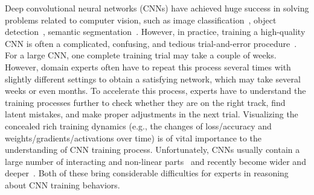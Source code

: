 \documentclass[format=acmsmall, review=false, screen=true]{acmart}
\begin{document}








\maketitle



Deep convolutional neural networks (CNNs) have achieved huge success in solving problems related to computer vision, such as image classification~\cite{krizhevsky2012imagenet, simonyan2014very}, object detection~\cite{girshick2014rich}, semantic segmentation~\cite{long2015fully}.
However, in practice, training a high-quality CNN is often a complicated, confusing, and tedious trial-and-error procedure~\cite{bengio2012practical}.
For a large CNN, one complete training trial may take a couple of weeks.
However, domain experts often have to repeat this process several times with slightly different settings to obtain a satisfying network, which may take several weeks or even months.
To accelerate this process, experts have to understand the training processes further to check whether they are on the right track, find latent mistakes, and make proper adjustments in the next trial.
Visualizing the concealed rich training dynamics (e.g., the changes of loss/accuracy and weights/gradients/activations over time) is of vital importance to the understanding of CNN training process.
Unfortunately, CNNs usually contain a large number of interacting and non-linear parts~\cite{bengio2013representation} and recently become wider and deeper~\cite{simonyan2014very, szegedy2015going, he2016deep, szegedy2016inception}. Both of these bring considerable difficulties for experts in reasoning about CNN training behaviors.
\end{document}
